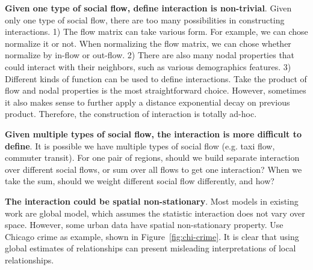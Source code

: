 \textbf{Given one type of social flow, define interaction is non-trivial}. Given only one type of social flow, there are too many possibilities in constructing interactions.   1) The flow matrix can take various form. For example, we can chose normalize it or not. When normalizing the flow matrix, we can chose whether normalize by in-flow or out-flow. 
2) There are also many nodal properties that could interact with their neighbors, such as various demographics features. 
3) Different kinds of function can be used to define interactions. Take the product of flow and nodal properties is the most straightforward choice. However, sometimes it also makes sense to further apply a distance exponential decay on previous product.
Therefore, the construction of interaction is totally ad-hoc. 


\textbf{Given multiple types of social flow, the interaction is more difficult to define}. It is possible we have multiple types of social flow (e.g. taxi flow, commuter transit). For one pair of regions, should we build separate interaction over different social flows, or sum over all flows to get one interaction? When we take the sum, should we weight different social flow differently, and how?


\textbf{The interaction could be spatial non-stationary}. Most models in existing work are global model, which assumes the statistic interaction does not vary over space. However, some urban data have spatial non-stationary property. Use Chicago crime as example, shown in Figure~\ref{fig:chi-crime}. It is clear that using global estimates of relationships can present misleading interpretations of local relationships.


